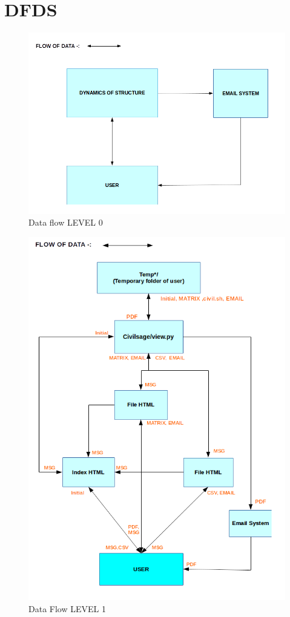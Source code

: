 \section{DFDS}
\begin{figure}[h]
\centering \includegraphics[scale=0.4]{images/DFDS.png}
\caption{Data flow LEVEL 0}
\end{figure}
\newpage
\begin{figure}[h]
\centering \includegraphics[scale=0.55]{images/DFDS1.png}
\caption{Data Flow LEVEL 1}
\end{figure}

